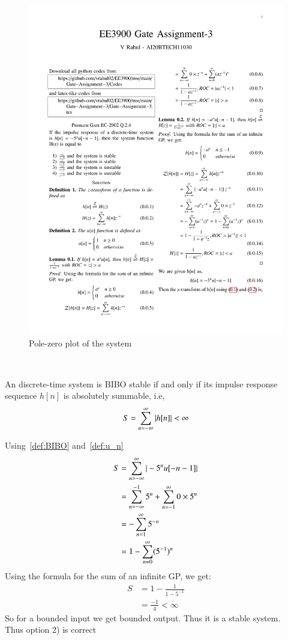 \documentclass[journal,12pt,twocolumn]{IEEEtran}
\begin{document}
\begin{figure}[!ht]
    \centering
    \includegraphics[width=\columnwidth]{Gate Assignment-3}
    \caption{Pole-zero plot of the system}
    \label{a}
\end{figure}\\
\begin{definition}\label{def:BIBO}
    An discrete-time system is BIBO stable if and only if its impulse response sequence $h[n]$ is absolutely summable, i.e,
    \begin{align}
        S=\sum_{n = -\infty}^\infty \vert h[n]\vert<\infty
    \end{align}
\end{definition}
Using~\eqref{def:BIBO} and~\eqref{def:u_n}
\begin{align}
    S&=\sum_{n = -\infty}^\infty \vert-5^nu[-n-1]\vert\\
     &= \sum_{n = -\infty}^{-1} {5^n} + \sum_{n = -1}^{\infty} 0\times {5^n}\\
    &=-\sum_{n = 1}^{\infty} 5^{-n}\\ 
    &=1-\sum_{n = 0}^{\infty} (5^{-1})^n
\end{align}
Using the formula for the sum of an infinite GP, we get:\\
\begin{align}
     S&= 1-\frac{1}{1 - 5^{-1}} \\
      &= \frac{-1}{4}<\infty
\end{align}
So for a bounded input we get bounded output. Thus it is a stable system.\\
Thus option 2) is correct
\end{document}

